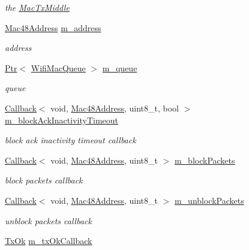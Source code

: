 \begin{DoxyCompactItemize}
\begin{DoxyCompactList}\small\item\em the \hyperlink{classns3_1_1MacTxMiddle}{Mac\+Tx\+Middle} \end{DoxyCompactList}\item 
\hyperlink{classns3_1_1Mac48Address}{Mac48\+Address} \hyperlink{classns3_1_1BlockAckManager_af22b7c479eb2dbd8e1e7a360e807d889}{m\+\_\+address}
\begin{DoxyCompactList}\small\item\em address \end{DoxyCompactList}\item 
\hyperlink{classns3_1_1Ptr}{Ptr}$<$ \hyperlink{namespacens3_a3ca96bcdf02c0e7cacea08ca62ead54c}{Wifi\+Mac\+Queue} $>$ \hyperlink{classns3_1_1BlockAckManager_a5bc9e0d123696600bbeff7aa37127ec7}{m\+\_\+queue}
\begin{DoxyCompactList}\small\item\em queue \end{DoxyCompactList}\item 
\hyperlink{classns3_1_1Callback}{Callback}$<$ void, \hyperlink{classns3_1_1Mac48Address}{Mac48\+Address}, uint8\+\_\+t, bool $>$ \hyperlink{classns3_1_1BlockAckManager_aca48203aee618ed997d26c5e77a246a7}{m\+\_\+block\+Ack\+Inactivity\+Timeout}
\begin{DoxyCompactList}\small\item\em block ack inactivity timeout callback \end{DoxyCompactList}\item 
\hyperlink{classns3_1_1Callback}{Callback}$<$ void, \hyperlink{classns3_1_1Mac48Address}{Mac48\+Address}, uint8\+\_\+t $>$ \hyperlink{classns3_1_1BlockAckManager_aed8b4d86e877d3e5a2ed869636328867}{m\+\_\+block\+Packets}
\begin{DoxyCompactList}\small\item\em block packets callback \end{DoxyCompactList}\item 
\hyperlink{classns3_1_1Callback}{Callback}$<$ void, \hyperlink{classns3_1_1Mac48Address}{Mac48\+Address}, uint8\+\_\+t $>$ \hyperlink{classns3_1_1BlockAckManager_a1ac5899b37bf2ffee1814cefebe8fe29}{m\+\_\+unblock\+Packets}
\begin{DoxyCompactList}\small\item\em unblock packets callback \end{DoxyCompactList}\item 
\hyperlink{classns3_1_1BlockAckManager_a982d21c899e65a7d1bdc181c8d6de2b4}{Tx\+Ok} \hyperlink{classns3_1_1BlockAckManager_ace96f46b7c52c441becc70227b70d070}{m\+\_\+tx\+Ok\+Callback}

\end{DoxyCompactItemize}
